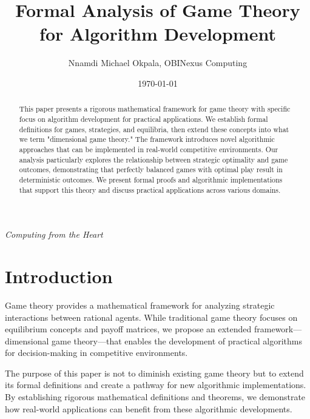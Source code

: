 \documentclass{article}
\title{Formal Analysis of Game Theory for Algorithm Development}
\author{Nnamdi Michael Okpala, OBINexus Computing}
\date{\today}
\begin{document}
\maketitle

\begin{center}

\textit{Computing from the Heart}
\end{center}

\begin{abstract}
This paper presents a rigorous mathematical framework for game theory with specific focus on algorithm development for practical applications. We establish formal definitions for games, strategies, and equilibria, then extend these concepts into what we term "dimensional game theory." The framework introduces novel algorithmic approaches that can be implemented in real-world competitive environments. Our analysis particularly explores the relationship between strategic optimality and game outcomes, demonstrating that perfectly balanced games with optimal play result in deterministic outcomes. We present formal proofs and algorithmic implementations that support this theory and discuss practical applications across various domains.
\end{abstract}

\section{Introduction}

Game theory provides a mathematical framework for analyzing strategic interactions between rational agents. While traditional game theory focuses on equilibrium concepts and payoff matrices, we propose an extended framework—dimensional game theory—that enables the development of practical algorithms for decision-making in competitive environments.

The purpose of this paper is not to diminish existing game theory but to extend its formal definitions and create a pathway for new algorithmic implementations. By establishing rigorous mathematical definitions and theorems, we demonstrate how real-world applications can benefit from these algorithmic developments.
\end{document}
